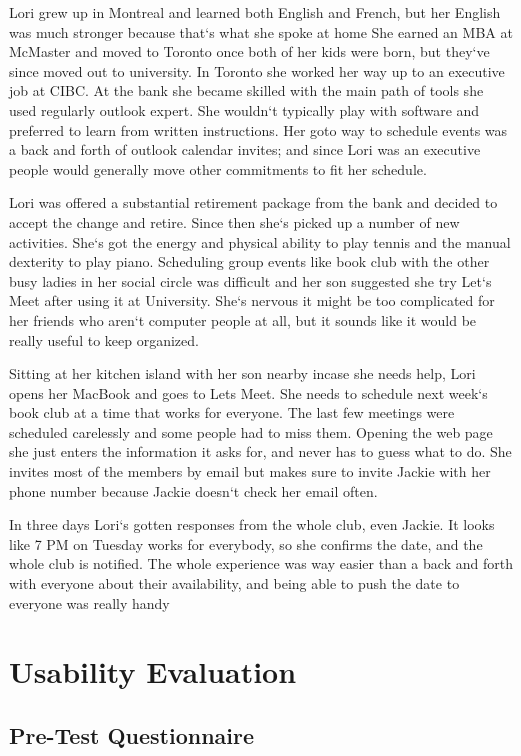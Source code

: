 \documentclass{sigchi}
\begin{document}
Lori grew up in Montreal and learned both English and French, but her English was much stronger because that`s what she spoke at home
She earned an MBA at McMaster and moved to Toronto once both of her kids were born, but they`ve since moved out to university. 
In Toronto she worked her way up to an executive job at CIBC.
At the bank she became skilled with the main path of tools she used regularly outlook expert.
She wouldn`t typically play with software and preferred to learn from written instructions.
Her goto way to schedule events was a back and forth of outlook calendar invites; 
and since Lori was an executive people would generally move other commitments to fit her schedule.
 
Lori was offered a substantial retirement package from the bank and decided to accept the change and retire. 
Since then she`s picked up a number of new activities.
She`s got the energy and physical ability to play tennis and the manual dexterity to play piano.
Scheduling group events like book club with the other busy ladies in her social circle was difficult and her son suggested she try Let`s Meet after using it at University.
She`s nervous it might be too complicated for her friends who aren`t computer people at all, but it sounds like it would be really useful to keep organized.

Sitting at her kitchen island with her son nearby incase she needs help, Lori opens her MacBook and goes to Lets Meet.
She needs to schedule next week`s book club at a time that works for everyone.
The last few meetings were scheduled carelessly and some people had to miss them.
Opening the web page she just enters the information it asks for, and never has to guess what to do.
She invites most of the members by email but makes sure to invite Jackie with her phone number because Jackie doesn`t check her email often.

In three days Lori`s gotten responses from the whole club, even Jackie.
It looks like 7 PM  on Tuesday works for everybody, so she confirms the date, and the whole club is notified.
The whole experience was way easier than a back and forth with everyone about their availability, and being able to push the date to everyone was really handy

\section{Usability Evaluation}

\subsection{Pre-Test Questionnaire}
\end{document}
